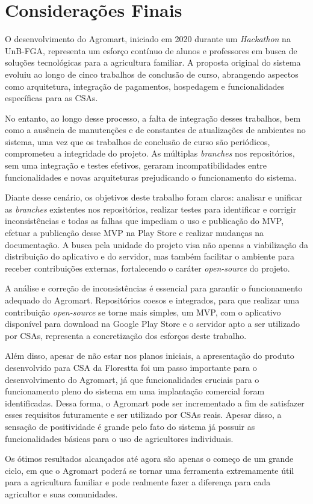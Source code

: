 \chapter[Considerações Finais]{Considerações Finais}

O desenvolvimento do Agromart, iniciado em 2020 durante um \textit{Hackathon} na UnB-FGA, representa um esforço contínuo de alunos e professores em busca de soluções tecnológicas para a agricultura familiar. A proposta original do sistema evoluiu ao longo de cinco trabalhos de conclusão de curso, abrangendo aspectos como arquitetura, integração de pagamentos, hospedagem e funcionalidades específicas para as CSAs.

No entanto, ao longo desse processo, a falta de integração desses trabalhos, bem como a ausência de manutenções e de constantes de atualizações de ambientes no sistema, uma vez que os trabalhos de conclusão de curso são periódicos, comprometeu a integridade do projeto. As múltiplas \textit{branches} nos repositórios, sem uma integração e testes efetivos, geraram incompatibilidades entre funcionalidades e novas arquiteturas prejudicando o funcionamento do sistema.

Diante desse cenário, os objetivos deste trabalho foram claros: analisar e unificar as \textit{branches} existentes nos repositórios, realizar testes para identificar e corrigir inconsistências e todas as falhas que impediam o uso e publicação do MVP, efetuar a publicação desse MVP na Play Store e realizar mudanças na documentação. A busca pela unidade do projeto visa não apenas a viabilização da distribuição do aplicativo e do servidor, mas também facilitar o ambiente para receber contribuições externas, fortalecendo o caráter \textit{open-source} do projeto.

A análise e correção de inconsistências é essencial para garantir o funcionamento adequado do Agromart. Repositórios coesos e integrados, para que realizar uma contribuição \textit{open-source} se torne mais simples, um MVP, com o aplicativo disponível para download na Google Play Store e o servidor apto a ser utilizado por CSAs, representa a concretização dos esforços deste trabalho.

Além disso, apesar de não estar nos planos iniciais, a apresentação do produto desenvolvido para CSA da Florestta foi um passo importante para o desenvolvimento do Agromart, já que funcionalidades cruciais para o funcionamento pleno do sistema em uma implantação comercial foram identificadas. Dessa forma, o Agromart pode ser incrementado a fim de satisfazer esses requisitos futuramente e ser utilizado por CSAs reais. Apesar disso, a sensação de positividade é grande pelo fato do sistema já possuir as funcionalidades básicas para o uso de agricultores individuais.

Os ótimos resultados alcançados até agora são apenas o começo de um grande ciclo, em que o Agromart poderá se tornar uma ferramenta extremamente útil para a agricultura familiar e pode realmente fazer a diferença para cada agricultor e suas comunidades.
